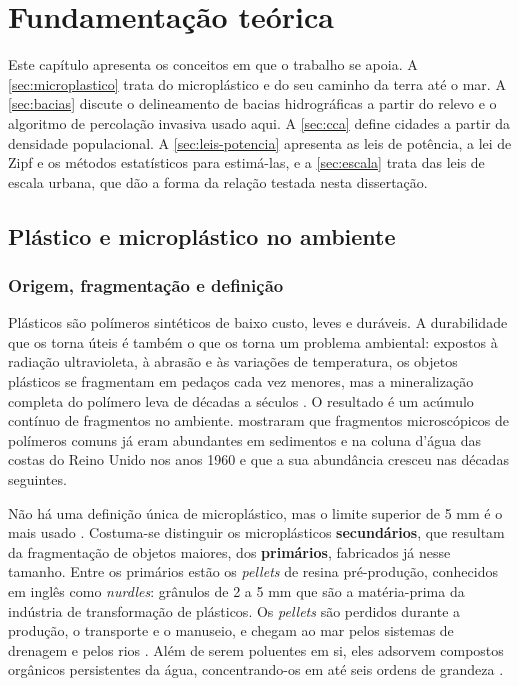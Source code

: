 \chapter{Fundamentação teórica}
\label{chap:fundamentacao}

Este capítulo apresenta os conceitos em que o trabalho se apoia. A \autoref{sec:microplastico} trata do microplástico e do seu caminho da terra até o mar. A \autoref{sec:bacias} discute o delineamento de bacias hidrográficas a partir do relevo e o algoritmo de percolação invasiva usado aqui. A \autoref{sec:cca} define cidades a partir da densidade populacional. A \autoref{sec:leis-potencia} apresenta as leis de potência, a lei de Zipf e os métodos estatísticos para estimá-las, e a \autoref{sec:escala} trata das leis de escala urbana, que dão a forma da relação testada nesta dissertação.

\section{Plástico e microplástico no ambiente}
\label{sec:microplastico}

\subsection{Origem, fragmentação e definição}

Plásticos são polímeros sintéticos de baixo custo, leves e duráveis. A durabilidade que os torna úteis é também o que os torna um problema ambiental: expostos à radiação ultravioleta, à abrasão e às variações de temperatura, os objetos plásticos se fragmentam em pedaços cada vez menores, mas a mineralização completa do polímero leva de décadas a séculos \cite{barnes2009,andrady2011}. O resultado é um acúmulo contínuo de fragmentos no ambiente.  mostraram que fragmentos microscópicos de polímeros comuns já eram abundantes em sedimentos e na coluna d'água das costas do Reino Unido nos anos 1960 e que a sua abundância cresceu nas décadas seguintes.

Não há uma definição única de microplástico, mas o limite superior de 5 mm é o mais usado \cite{frias2019}. Costuma-se distinguir os microplásticos \textbf{secundários}, que resultam da fragmentação de objetos maiores, dos \textbf{primários}, fabricados já nesse tamanho. Entre os primários estão os \textit{pellets} de resina pré-produção, conhecidos em inglês como \textit{nurdles}: grânulos de 2 a 5 mm que são a matéria-prima da indústria de transformação de plásticos. Os \textit{pellets} são perdidos durante a produção, o transporte e o manuseio, e chegam ao mar pelos sistemas de drenagem e pelos rios \cite{karlsson2018}. Além de serem poluentes em si, eles adsorvem compostos orgânicos persistentes da água, concentrando-os em até seis ordens de grandeza \cite{mato2001}.

